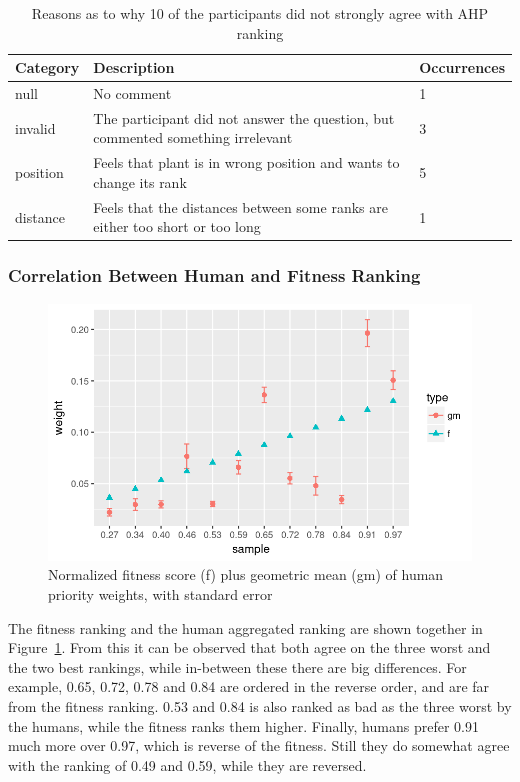 \begin{table}
    \centering
    \begin{tabularx}{\textwidth}{| l | X | l |}
    \hline
    \textbf{Category} & \textbf{Description} & \textbf{Occurrences} \\ \hline
    null & No comment & 1 \\
    \hline
    invalid & The participant did not answer the question, but commented something irrelevant & 3 \\
    \hline
    position & Feels that plant is in wrong position and wants to change its rank & 5 \\
    \hline
    distance & Feels that the distances between some ranks are either too short or too long & 1 \\
    \hline
    \end{tabularx}
    \caption{Reasons as to why 10 of the participants did not strongly agree with AHP ranking}
    \label{tab:agree-why}
\end{table}

\subsubsection{Correlation Between Human and Fitness Ranking}
\begin{figure}
    \centering
    \includegraphics[width=1.0\textwidth]{figures/weights}
    \caption[Fitness score plus geometric mean and arithmetic mean of priority weights]{Normalized fitness score (f) plus geometric mean (gm) of human priority weights, with standard error}
    \label{fig:weights}
\end{figure}

The fitness ranking and the human aggregated ranking are shown together in Figure~\ref{fig:weights}.
From this it can be observed that both agree on the three worst and the two best rankings, while in-between these there are big differences.
For example, 0.65, 0.72, 0.78 and 0.84 are ordered in the reverse order, and are far from the fitness ranking.
0.53 and 0.84 is also ranked as bad as the three worst by the humans, while the fitness ranks them higher.
Finally, humans prefer 0.91 much more over 0.97, which is reverse of the fitness.
Still they do somewhat agree with the ranking of 0.49 and 0.59, while they are reversed.

